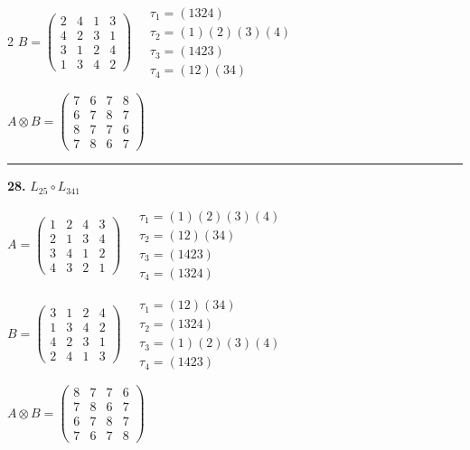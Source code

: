 \begin{multicols}{2}
$B = \begin{pmatrix} 2 & 4 & 1 & 3 \\ 4 & 2 & 3 & 1 \\ 3 & 1 & 2 & 4 \\ 1 & 3 & 4 & 2 \end{pmatrix} \quad \begin{matrix} \tau_{1}=(1 3 2 4) \\ \tau_{2}=(1)(2)(3)(4) \\ \tau_{3}=(1 4 2 3) \\ \tau_{4}=(1 2)(3 4) \end{matrix}$

$A \otimes B = \begin{pmatrix} 7 & 6 & 7 & 8 \\ 6 & 7 & 8 & 7 \\ 8 & 7 & 7 & 6 \\ 7 & 8 & 6 & 7 \end{pmatrix}$

\vspace{0.3em}
\hrule
\vspace{0.3em}

\noindent\textbf{28.} $L_{25} \circ L_{341}$

$A = \begin{pmatrix} 1 & 2 & 4 & 3 \\ 2 & 1 & 3 & 4 \\ 3 & 4 & 1 & 2 \\ 4 & 3 & 2 & 1 \end{pmatrix} \quad \begin{matrix} \tau_{1}=(1)(2)(3)(4) \\ \tau_{2}=(1 2)(3 4) \\ \tau_{3}=(1 4 2 3) \\ \tau_{4}=(1 3 2 4) \end{matrix}$

$B = \begin{pmatrix} 3 & 1 & 2 & 4 \\ 1 & 3 & 4 & 2 \\ 4 & 2 & 3 & 1 \\ 2 & 4 & 1 & 3 \end{pmatrix} \quad \begin{matrix} \tau_{1}=(1 2)(3 4) \\ \tau_{2}=(1 3 2 4) \\ \tau_{3}=(1)(2)(3)(4) \\ \tau_{4}=(1 4 2 3) \end{matrix}$

$A \otimes B = \begin{pmatrix} 8 & 7 & 7 & 6 \\ 7 & 8 & 6 & 7 \\ 6 & 7 & 8 & 7 \\ 7 & 6 & 7 & 8 \end{pmatrix}$


\end{multicols}
